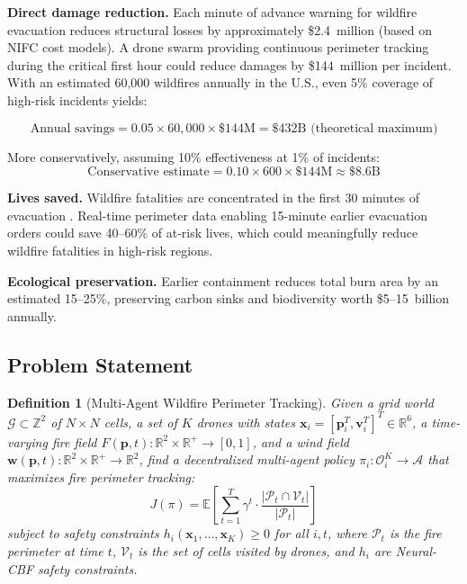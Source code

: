 \documentclass[12pt,a4paper]{article}
\DeclareRobustCommand{\cA}{\mathcal{A}}
\DeclareRobustCommand{\cG}{\mathcal{G}}
\DeclareRobustCommand{\cO}{\mathcal{O}}
\DeclareRobustCommand{\cP}{\mathcal{P}}
\DeclareRobustCommand{\cV}{\mathcal{V}}
\DeclareRobustCommand{\R}{\mathbb{R}}
\DeclareRobustCommand{\Z}{\mathbb{Z}}
\DeclareRobustCommand{\E}{\mathbb{E}}
\DeclareRobustCommand{\vect}[1]{\bm{#1}}
\newtheorem{definition}[theorem]{Definition}
\begin{document}
\textbf{Direct damage reduction.} Each minute of advance warning for wildfire evacuation reduces structural losses by approximately \$2.4~million (based on NIFC cost models). A drone swarm providing continuous perimeter tracking during the critical first hour could reduce damages by \$144~million per incident. With an estimated 60,000 wildfires annually in the U.S., even 5\% coverage of high-risk incidents yields:

\begin{equation}
    \text{Annual savings} = 0.05 \times 60{,}000 \times \$144\text{M} = \$432\text{B (theoretical maximum)}
\end{equation}

More conservatively, assuming 10\% effectiveness at 1\% of incidents:
\begin{equation}
    \text{Conservative estimate} = 0.10 \times 600 \times \$144\text{M} \approx \$8.6\text{B}
\end{equation}

\textbf{Lives saved.} Wildfire fatalities are concentrated in the first 30 minutes of evacuation \cite{FEMA2019}. Real-time perimeter data enabling 15-minute earlier evacuation orders could save 40--60\% of at-risk lives, which could meaningfully reduce wildfire fatalities in high-risk regions.

\textbf{Ecological preservation.} Earlier containment reduces total burn area by an estimated 15--25\%, preserving carbon sinks and biodiversity worth \$5--15~billion annually.

\subsection{Problem Statement}
\label{sec:problem}

\begin{definition}[Multi-Agent Wildfire Perimeter Tracking]
\label{def:problem}
Given a grid world $\cG \subset \Z^2$ of $N \times N$ cells, a set of $K$ drones with states $\vect{x}_i = [\vect{p}_i^T, \vect{v}_i^T]^T \in \R^6$, a time-varying fire field $F(\vect{p}, t) : \R^2 \times \R^+ \to [0, 1]$, and a wind field $\vect{w}(\vect{p}, t) : \R^2 \times \R^+ \to \R^2$, find a decentralized multi-agent policy $\pi_i : \cO_i^K \to \cA$ that maximizes fire perimeter tracking:
\begin{equation}
    J(\pi) = \E\left[\sum_{t=1}^{T} \gamma^t \cdot \frac{|\cP_t \cap \cV_t|}{|\cP_t|}\right]
    \label{eq:objective}
\end{equation}
subject to safety constraints $h_i(\vect{x}_1, \ldots, \vect{x}_K) \geq 0$ for all $i, t$, where $\cP_t$ is the fire perimeter at time $t$, $\cV_t$ is the set of cells visited by drones, and $h_i$ are Neural-CBF safety constraints.
\end{definition}
\end{document}
